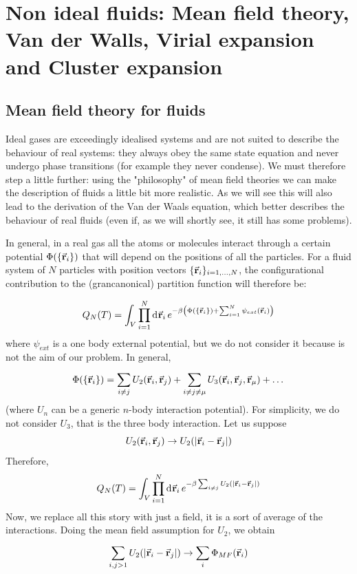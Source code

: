 \documentclass[../../Main/Main.tex]{subfiles}
\begin{document}
\chapter{Non ideal fluids: Mean field theory, Van der Walls, Virial expansion and Cluster expansion}

\section{Mean field theory for fluids}

Ideal gases are exceedingly idealised systems and are not suited to describe the behaviour of real systems: they always obey the same state equation and never undergo phase transitions (for example they never condense). We must therefore step a little further: using the "philosophy" of mean field theories we can make the description of fluids a little bit more realistic. As we will see this will also lead to the derivation of the Van der Waals equation, which better describes the behaviour of real fluids (even if, as we will shortly see, it still has some problems).

In general, in a real gas all the atoms or molecules interact through a certain potential \(\Phi(\{\va{r}_i\})\) that will depend on the positions of all the particles. For a fluid system of  \( N \) particles  with position vectors \( \{ \va{r}_i \}_{i=1,\dots,N}   \), the configurational contribution to the (grancanonical) partition function will therefore be:

\begin{equation}
  Q_N (T) = \int_{V}^{} \prod_{i=1}^{N}  \dd[]{\va{r}_i}  e^ {-\beta  \qty( \Phi(\{\va{r}_i\}) + \sum_{i=1}^{N} \psi _{ext}  (\va{r}_i) ) }
\end{equation}
where \( \psi _{ext} \) is a one body external potential, but we do not consider it because is not the aim of our problem. In general,
\begin{equation*}
  \Phi (\{ \va{r}_i \}  ) = \sum_{i\neq j}^{}  U_2 (\va{r}_i,\va{r}_j) + \sum_{i\neq j\neq \mu }^{} U_3 (\va{r}_i, \va{r}_j, \va{r}_ \mu ) + \dots
\end{equation*}
(where \(U_{n} \) can be a generic \(n\)-body interaction potential). For simplicity, we do not consider \( U_3 \), that is the three body interaction. Let us suppose
\begin{equation*}
   U_2 (\va{r}_i,\va{r}_j) \rightarrow U_2 ( \abs{\va{r}_i - \va{r}_j} )
\end{equation*}
Therefore,
\begin{equation*}
  Q_N (T) = \int_{V}^{} \prod_{i=1}^{N}  \dd[]{\va{r}_i}  e^ {-\beta \sum_{i\neq j }^{}  U_2 ( \abs{\va{r}_i - \va{r}_j} ) }
\end{equation*}
Now, we replace all this story with just a field, it is a sort of average of the interactions. Doing the mean field assumption for \( U_2 \), we obtain
\begin{equation*}
  \sum_{i,j > 1 }^{}  U_2 ( \abs{\va{r}_i - \va{r}_j} ) \rightarrow \sum_{i}^{} \Phi _{MF} (\va{r}_i)
\end{equation*}
\end{document}
